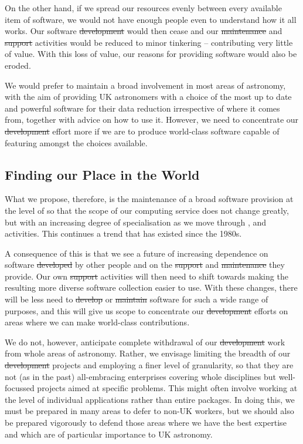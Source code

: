 On the other hand, if we spread our resources evenly between every
available item of software, we would not have enough people even to
understand how it all works. Our software \st{development} would then
cease and our \st{maintenance} and \st{support} activities would be
reduced to minor tinkering -- contributing very little of value. With
this loss of value, our reasons for providing software
\st{} would also be eroded.

We would prefer to maintain a broad involvement in most areas of
astronomy, with the aim of providing UK astronomers with a choice of
the most up to date and powerful software for their data reduction
irrespective of where it comes from, together with advice on how to
use it. However, we need to concentrate our \st{development} effort
more if we are to produce world-class software capable of featuring
amongst the choices available.

\subsection{Finding our Place in the World}

What we propose, therefore, is the maintenance of a broad software
provision at the level of \st{} so that the scope of our
computing service does not change greatly, but with an increasing
degree of specialisation as we move through \st{},
\st{} and \st{} activities. This continues a
trend that has existed since the 1980s.

A consequence of this is that we see a future of increasing dependence
on software \st{developed} by other people and on the \st{support}
and \st{maintenance} they provide.  Our own \st{support} activities
will then need to shift towards making the resulting more diverse
software collection easier to use.  With these changes, there will be
less need to \st{develop} or \st{maintain} software for such a wide
range of purposes, and this will give us scope to concentrate our
\st{development} efforts on areas where we can make world-class
contributions.

We do not, however, anticipate complete withdrawal of our
\st{development} work from whole areas of astronomy.  Rather, we
envisage limiting the breadth of our \st{development} projects and
employing a finer level of granularity, so that they are not (as in
the past) all-embracing enterprises covering whole disciplines but
well-focussed projects aimed at specific problems. This might often
involve working at the level of individual applications rather than
entire packages.  In doing this, we must be prepared in many areas to
defer to non-UK workers, but we should also be prepared vigorously to
defend those areas where we have the best expertise and which are of
particular importance to UK astronomy.

